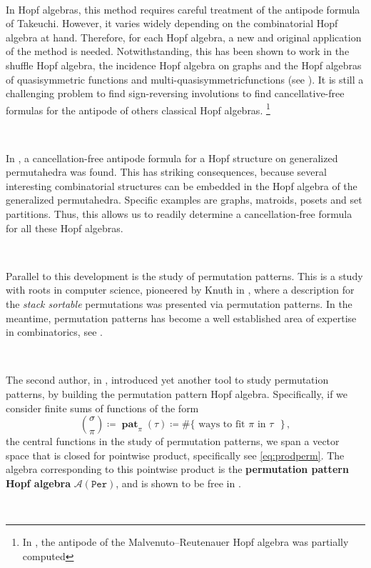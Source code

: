 \documentclass[12pt, reqno]{amsart}
\theoremstyle{definition}
\DeclareMathOperator{\pat}{\mathbf{pat}}
\begin{document}
\

In Hopf algebras, this method requires careful treatment of the antipode formula of Takeuchi.
However, it varies widely depending on the combinatorial Hopf algebra at hand.
Therefore, for each Hopf algebra, a new and original application of the method is needed.
Notwithstanding, this has been shown to work in the shuffle Hopf algebra, the incidence Hopf algebra on graphs and the Hopf algebras of quasisymmetric functions and multi-quasisymmetricfunctions (see \cite{BS2017}). It is still a challenging problem to find sign-reversing involutions to find cancellative-free formulas for the antipode of others classical Hopf algebras.  \footnote{In \cite{MalvenutoReutenauer}, the antipode of the Malvenuto–Reutenauer Hopf algebra was partially computed}


\

In \cite{aguiar2017hopf}, a cancellation-free antipode formula for a Hopf structure on generalized permutahedra was found. 
This has striking consequences, because several interesting combinatorial structures can be embedded in the Hopf algebra of the generalized permutahedra.
Specific examples are graphs, matroids, posets and set partitions.
Thus, this allows us to readily determine a cancellation-free formula for all these Hopf algebras.

\

Parallel to this development is the study of permutation patterns.
This is a study with roots in computer science, pioneered by Knuth in \cite{Knuth}, where a description for the \textit{stack sortable} permutations was presented via permutation patterns.
In the meantime, permutation patterns has become a well established area of expertise in combinatorics, see \cite{linton2010permutation}.

\

The second author, in \cite{Vargas}, introduced yet another tool to study permutation patterns, by building the permutation pattern Hopf algebra.
Specifically, if we consider finite sums of functions of the form 
$$ \binom{\sigma}{\pi} \coloneqq \pat_{\pi}(\tau)\coloneqq  \#\{\text{ ways to fit $\pi$ in $\tau$ }\}\, ,$$
the central functions in the study of permutation patterns, we span a vector space that is closed for pointwise product, specifically see \eqref{eq:prodperm}.
The algebra corresponding to this pointwise product is the \textbf{permutation pattern Hopf algebra} $\mathcal{A}(\mathtt{Per})$, and is shown to be free in \cite{Vargas}.

\
\end{document}
